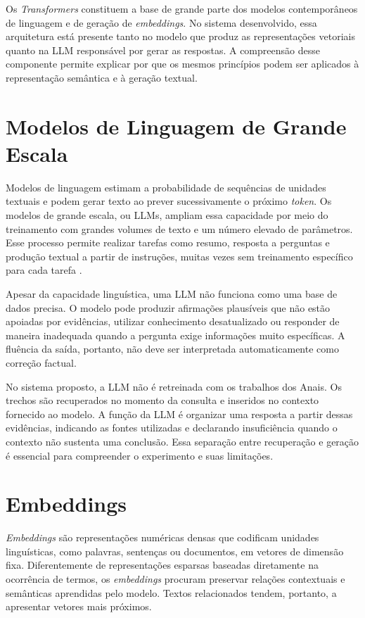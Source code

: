 Os \textit{Transformers} constituem a base de grande parte dos modelos contemporâneos de linguagem e de geração de \textit{embeddings}. No sistema desenvolvido, essa arquitetura está presente tanto no modelo que produz as representações vetoriais quanto na LLM responsável por gerar as respostas. A compreensão desse componente permite explicar por que os mesmos princípios podem ser aplicados à representação semântica e à geração textual.

\section{Modelos de Linguagem de Grande Escala}

Modelos de linguagem estimam a probabilidade de sequências de unidades textuais e podem gerar texto ao prever sucessivamente o próximo \textit{token}. Os modelos de grande escala, ou LLMs, ampliam essa capacidade por meio do treinamento com grandes volumes de texto e um número elevado de parâmetros. Esse processo permite realizar tarefas como resumo, resposta a perguntas e produção textual a partir de instruções, muitas vezes sem treinamento específico para cada tarefa \cite{brown2020gpt3}.

Apesar da capacidade linguística, uma LLM não funciona como uma base de dados precisa. O modelo pode produzir afirmações plausíveis que não estão apoiadas por evidências, utilizar conhecimento desatualizado ou responder de maneira inadequada quando a pergunta exige informações muito específicas. A fluência da saída, portanto, não deve ser interpretada automaticamente como correção factual.

No sistema proposto, a LLM não é retreinada com os trabalhos dos Anais. Os trechos são recuperados no momento da consulta e inseridos no contexto fornecido ao modelo. A função da LLM é organizar uma resposta a partir dessas evidências, indicando as fontes utilizadas e declarando insuficiência quando o contexto não sustenta uma conclusão. Essa separação entre recuperação e geração é essencial para compreender o experimento e suas limitações.

\section{Embeddings}

\textit{Embeddings} são representações numéricas densas que codificam unidades linguísticas, como palavras, sentenças ou documentos, em vetores de dimensão fixa. Diferentemente de representações esparsas baseadas diretamente na ocorrência de termos, os \textit{embeddings} procuram preservar relações contextuais e semânticas aprendidas pelo modelo. Textos relacionados tendem, portanto, a apresentar vetores mais próximos.

